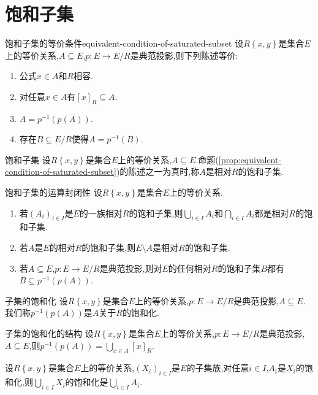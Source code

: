 \section{饱和子集}

\begin{proposition}{饱和子集的等价条件}{equivalent-condition-of-saturated-subset}
	设$R\left\{x,y\right\}$是集合$E$上的等价关系,$A\subseteq E$,$p:E\to E/R$是典范投影,则下列陈述等价:
	\begin{enumerate}
		\item 公式$x\in A$和$R$相容.
		\item 对任意$x\in A$有$\left[x\right]_{R}\subseteq A$.
		\item $A=p^{-1}\left(p\left(A\right)\right)$.
		\item 存在$B\subseteq E/R$使得$A=p^{-1}\left(B\right)$.
	\end{enumerate}
\end{proposition}

\begin{definition}{饱和子集}{}
	设$R\left\{x,y\right\}$是集合$E$上的等价关系,$A\subseteq E$.命题(\cref{prop:equivalent-condition-of-saturated-subset})的陈述之一为真时,称$A$是相对$R$的饱和子集.
\end{definition}

\begin{proposition}{饱和子集的运算封闭性}{}
	设$R\left\{x,y\right\}$是集合$E$上的等价关系.
	\begin{enumerate}
		\item 若$\left(A_{i}\right)_{i\in I}$是$E$的一族相对$R$的饱和子集,则$\bigcup\limits_{i\in I}A_{i}$和$\bigcap\limits_{i\in I}A_{i}$都是相对$R$的饱和子集.
		\item 若$A$是$E$的相对$R$的饱和子集,则$E\setminus A$是相对$R$的饱和子集.
		\item 若$A\subseteq E$,$p:E\to E/R$是典范投影,则对$E$的任何相对$R$的饱和子集$B$都有$B\subseteq p^{-1}\left(p\left(A\right)\right)$.
	\end{enumerate}
\end{proposition}

\begin{definition}{子集的饱和化}{}
	设$R\left\{x,y\right\}$是集合$E$上的等价关系,$p:E\to E/R$是典范投影,$A\subseteq E$.我们称$p^{-1}\left(p\left(A\right)\right)$是$A$关于$R$的饱和化.
\end{definition}

\begin{proposition}{子集的饱和化的结构}{}
	设$R\left\{x,y\right\}$是集合$E$上的等价关系,$p:E\to E/R$是典范投影,$A\subseteq E$,则$p^{-1}\left(p\left(A\right)\right)=\bigcup\limits_{x\in A}\left[x\right]_{R}$.
\end{proposition}

\begin{proposition}{}{}
	设$R\left\{x,y\right\}$是集合$E$上的等价关系,$\left(X_{i}\right)_{i\in I}$是$E$的子集族,对任意$i\in I$,$A_{i}$是$X_{i}$的饱和化,则$\bigcup\limits_{i\in I}X_{i}$的饱和化是$\bigcup\limits_{i\in I}A_{i}$.
\end{proposition}







